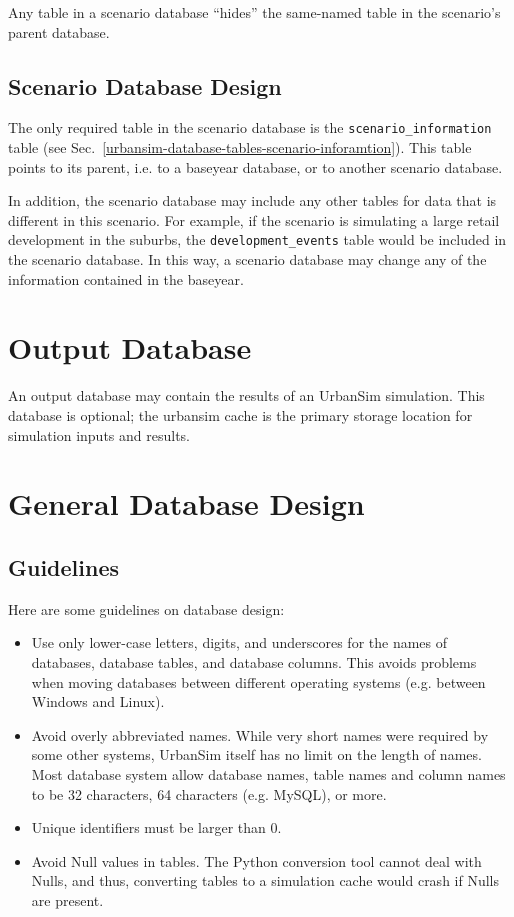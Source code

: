 Any table in a scenario database ``hides'' the same-named table in the
scenario's parent database.

\subsection{Scenario Database Design}

The only required table in the scenario database is the
\verb|scenario_information| table (see Sec.~\ref{urbansim-database-tables-scenario-inforamtion}).
This table points to its parent, i.e. to a baseyear database, or
to another scenario database.

In addition, the scenario database may include any other tables for data that
is different in this scenario. For example, if the scenario is simulating a
large retail development in the suburbs, the \verb|development_events| table
would be included in the scenario database.  In this way, a scenario database
may change any of the information contained in the baseyear.

\section{Output Database}

An output database may contain the results of an UrbanSim simulation.  This
database is optional; the urbansim cache is the primary storage location for
simulation inputs and results.

\section{General Database Design}

\subsection{Guidelines}

Here are some guidelines on database design:

\begin{itemize}
\item Use only lower-case letters, digits, and underscores for the names of
databases, database tables, and database columns. This avoids problems when
moving databases between different operating systems (e.g. between Windows and
Linux). 
\item Avoid overly abbreviated names.  While very short names were required by
some other systems, UrbanSim itself has no limit on the length of names. Most
database system allow database names, table names and column names to be 32
characters, 64 characters (e.g. MySQL), \mysqlindex or more.
\item Unique identifiers must be larger than 0. 
\item Avoid Null values in tables. The Python conversion tool cannot deal with 
Nulls, and thus, converting tables to a simulation cache would crash if Nulls are present.  
\end{itemize}

